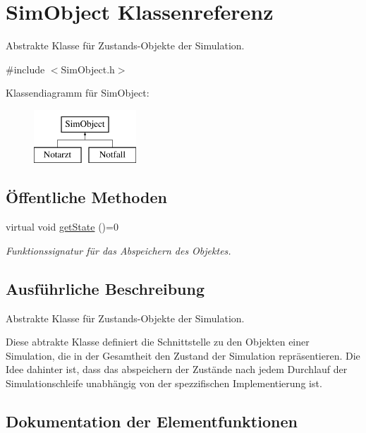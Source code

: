 \hypertarget{classSimObject}{}\section{Sim\+Object Klassenreferenz}
\label{classSimObject}


Abstrakte Klasse für Zustands-\/\+Objekte der Simulation.  




{\ttfamily \#include $<$Sim\+Object.\+h$>$}

Klassendiagramm für Sim\+Object\+:\begin{figure}[H]
\begin{center}
\leavevmode
\includegraphics[height=2.000000cm]{classSimObject}
\end{center}
\end{figure}
\subsection*{Öffentliche Methoden}
\begin{DoxyCompactItemize}
\item 
virtual void \hyperlink{classSimObject_a3100e6db6c86456b79351c7e6a62ec65}{get\+State} ()=0
\begin{DoxyCompactList}\small\item\em Funktionssignatur für das Abspeichern des Objektes. \end{DoxyCompactList}\end{DoxyCompactItemize}


\subsection{Ausführliche Beschreibung}
Abstrakte Klasse für Zustands-\/\+Objekte der Simulation. 

Diese abtrakte Klasse definiert die Schnittstelle zu den Objekten einer Simulation, die in der Gesamtheit den Zustand der Simulation repräsentieren. Die Idee dahinter ist, dass das abspeichern der Zustände nach jedem Durchlauf der Simulationschleife unabhängig von der spezzifischen Implementierung ist. 

\subsection{Dokumentation der Elementfunktionen}
